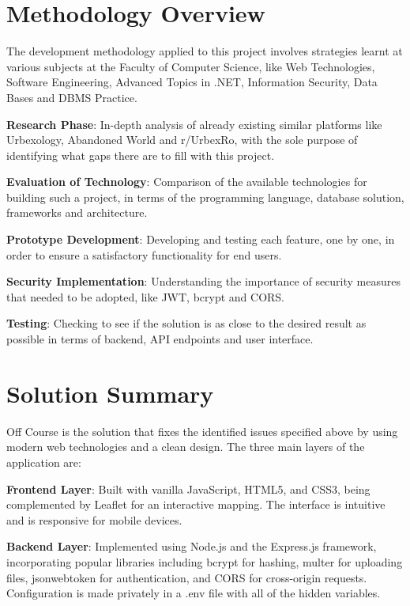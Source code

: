 \documentclass[12pt,a4paper]{report}
\begin{document}
\section*{Methodology Overview}

The development methodology applied to this project involves strategies learnt at various subjects at the Faculty of Computer Science, like Web Technologies, Software Engineering, Advanced Topics in .NET, Information Security, Data Bases and DBMS Practice.

\textbf{Research Phase}: In-depth analysis of already existing similar platforms like Urbexology, Abandoned World and r/UrbexRo, with the sole purpose of identifying what gaps there are to fill with this project.

\textbf{Evaluation of Technology}: Comparison of the available technologies for building such a project, in terms of the programming language, database solution, frameworks and architecture.

\textbf{Prototype Development}: Developing and testing each feature, one by one, in order to ensure a satisfactory functionality for end users.

\textbf{Security Implementation}: Understanding the importance of security measures that needed to be adopted, like JWT, bcrypt and CORS.

\textbf{Testing}: Checking to see if the solution is as close to the desired result as possible in terms of backend, API endpoints and user interface.

\section*{Solution Summary}

Off Course is the solution that fixes the identified issues specified above by using modern web technologies and a clean design. The three main layers of the application are:

\textbf{Frontend Layer}: Built with vanilla JavaScript, HTML5, and CSS3, being complemented by Leaflet for an interactive mapping. The interface is intuitive and is responsive for mobile devices.

\textbf{Backend Layer}: Implemented using Node.js and the Express.js framework, incorporating popular libraries including bcrypt for hashing, multer for uploading files, jsonwebtoken for authentication, and CORS for cross-origin requests. Configuration is made privately in a .env file with all of the hidden variables.
\end{document}
